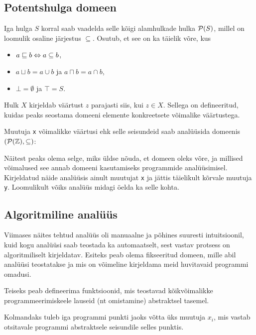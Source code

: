 \documentclass[../thesis.tex]{subfiles}
\begin{document}
\subsection{Potentshulga domeen}

Iga hulga $S$ korral saab vaadelda selle kõigi alamhulkade hulka $\mathcal{P}(S)$, millel on loomulik osaline järjestus $\subseteq$.
Osutub, et see on ka täielik võre, kus
\begin{itemize}[nosep]
	\item $a \sqsubseteq b \Leftrightarrow a \subseteq b$,
	\item $a \sqcup b = a \cup b$ ja $a \sqcap b = a \cap b$,
	\item $\bot = \emptyset$ ja $\top = S$.
\end{itemize}

Hulk $X$ kirjeldab väärtust $z$ parajasti siis, kui $z \in X$. Sellega on defineeritud, kuidas peaks seostama domeeni elemente konkreetsete võimalike väärtustega.

Muutuja \texttt{x} võimalikke väärtusi ehk selle seisundeid saab analüüsida domeenis $(\mathcal{P}(\mathbb{Z}), \subseteq)$:

Näitest peaks olema selge, miks üldse nõuda, et domeen oleks võre, ja millised võimalused see annab domeeni kasutamiseks programmide analüüsimisel. Kirjeldatud näide analüüsis ainult muutujat \texttt{x} ja jättis täielikult kõrvale muutuja \texttt{y}. Loomulikult võiks analüüs midagi öelda ka selle kohta.


\subsection{Algoritmiline analüüs}
Viimases näites tehtud analüüs oli manuaalne ja põhines suuresti intuitsioonil, kuid kogu analüüsi saab teostada ka automaatselt, sest vastav protsess on algoritmiliselt kirjeldatav. Esiteks peab olema fikseeritud domeen, mille abil analüüsi teostatakse ja mis on võimeline kirjeldama meid huvitavaid programmi omadusi.

Teiseks peab defineerima funktsioonid, mis teostavad kõikvõimalikke programmeerimiskeele lauseid (nt omistamine) abstraktsel tasemel.

Kolmandaks tuleb iga programmi punkti jaoks võtta üks muutuja $x_i$, mis vastab otsitavale programmi abstraktsele seisundile selles punktis.
\end{document}
